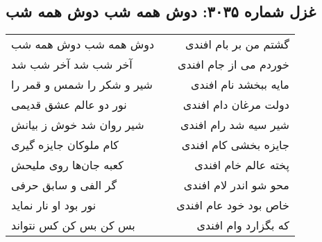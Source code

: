 \begin{center}
\section*{غزل شماره ۳۰۳۵: دوش همه شب دوش همه شب}
\label{sec:3035}
\begin{longtable}{l p{0.5cm} r}
دوش همه شب دوش همه شب
&&
گشتم من بر بام افندی
\\
آخر شب شد آخر شب شد
&&
خوردم می از جام افندی
\\
شیر و شکر را شمس و قمر را
&&
مایه ببخشد نام افندی
\\
نور دو عالم عشق قدیمی
&&
دولت مرغان دام افندی
\\
شیر روان شد خوش ز بیانش
&&
شیر سیه شد رام افندی
\\
کام ملوکان جایزه گیری
&&
جایزه بخشی کام افندی
\\
کعبه جان‌ها روی ملیحش
&&
پخته عالم خام افندی
\\
گر الفی و سابق حرفی
&&
محو شو اندر لام افندی
\\
نور بود او نار نماید
&&
خاص بود خود عام افندی
\\
بس کن بس کن کس نتواند
&&
که بگزارد وام افندی
\\
\end{longtable}
\end{center}
